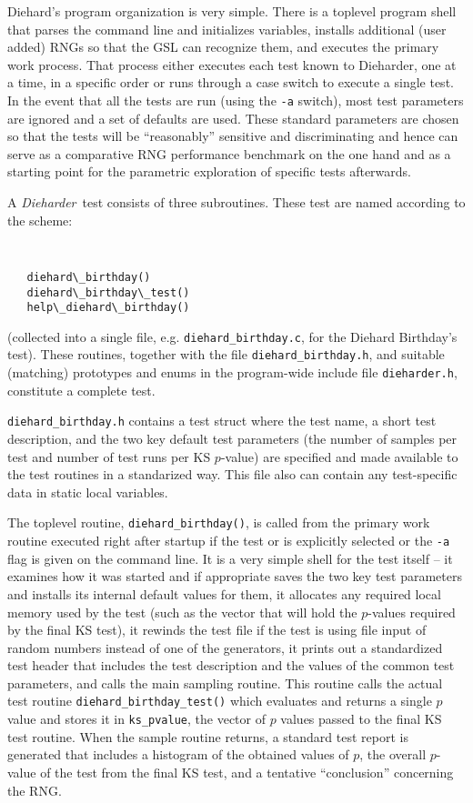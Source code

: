 \documentclass[12pt]{book}
\newcommand{\die}{\emph{Dieharder}\ }
\begin{document}
Diehard's program organization is very simple.  There is a toplevel
program shell that parses the command line and initializes variables,
installs additional (user added) RNGs so that the GSL can recognize
them, and executes the primary work process.  That process either
executes each test known to Dieharder, one at a time, in a specific
order or runs through a case switch to execute a single test.  In the
event that all the tests are run (using the {\tt -a} switch), most test
parameters are ignored and a set of defaults are used.  These standard
parameters are chosen so that the tests will be ``reasonably'' sensitive
and discriminating and hence can serve as a comparative RNG performance
benchmark on the one hand and as a starting point for the parametric
exploration of specific tests afterwards.

A \die test consists of three subroutines.  These test are named
according to the scheme:  
{\tt
\begin{verbatim}
   diehard\_birthday()
   diehard\_birthday\_test()
   help\_diehard\_birthday()
\end{verbatim} 
} 
\noindent (collected into a single file, e.g. {\tt diehard\_birthday.c},
for the Diehard Birthday's test).  These routines, together with the
file {\tt diehard\_birthday.h}, and suitable (matching) prototypes and
enums in the program-wide include file {\tt dieharder.h}, constitute a
complete test.

{\tt diehard\_birthday.h} contains a test struct where the test name, a
short test description, and the two key default test parameters (the
number of samples per test and number of test runs per KS $p$-value) are
specified and made available to the test routines in a standarized way.
This file also can contain any test-specific data in static local
variables.

The toplevel routine, {\tt diehard\_birthday()}, is called from the
primary work routine executed right after startup if the test or is
explicitly selected or the {\tt -a} flag is given on the command line.
It is a very simple shell for the test itself -- it examines how it was
started and if appropriate saves the two key test parameters and
installs its internal default values for them, it allocates any required
local memory used by the test (such as the vector that will hold the
$p$-values required by the final KS test), it rewinds the test file if
the test is using file input of random numbers instead of one of the
generators, it prints out a standardized test header that includes the
test description and the values of the common test parameters, and
calls the main sampling routine.  This routine calls the actual test
routine {\tt diehard\_birthday\_test()} which evaluates and returns a
single $p$ value and stores it in {\tt ks\_pvalue}, the vector of $p$
values passed to the final KS test routine.  When the sample routine
returns, a standard test report is generated that includes a histogram
of the obtained values of $p$, the overall $p$-value of the test from
the final KS test, and a tentative ``conclusion'' concerning the RNG.
\end{document}
